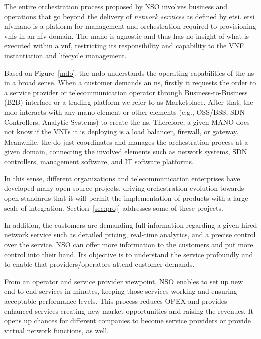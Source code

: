 The entire orchestration process proposed by NSO involves business and operations that go beyond the delivery of \textit{network services} as defined by \gls{etsi}. \gls{etsi} \gls{nfvmano} is a platform for management and orchestration required to provisioning \glspl{vnf} in an \gls{nfv} domain. The \gls{mano} is agnostic and thus has no insight of what is executed within a \gls{vnf}, restricting its responsibility and capability to the VNF instantiation and lifecycle management.

Based on Figure~\ref{mdo}, the \gls{mdo} understands the operating capabilities of the \gls{ns} in a broad sense. When a customer demands an \gls{ns}, firstly it requests the order to a service provider or telecommunication operator through Business-to-Business (B2B) interface or a trading platform we refer to as Marketplace. After that, the \gls{mdo} interacts with any \gls{mano} element or other elements (e.g., OSS/BSS, SDN Controllers, Analytic Systems)  to create the \gls{ns}. Therefore, a given MANO does not know if the VNFs it is deploying is a load balancer, firewall, or gateway. Meanwhile, the \gls{do} just coordinates and manages the orchestration process at a given domain, connecting the involved elements such as network systems, SDN controllers, management software, and IT software platforms.

In this sense, different organizations and telecommunication enterprises have developed many open source projects, driving orchestration evolution towards open standards that it will permit the implementation of products with a large scale of integration. Section~\ref{sec:proj} addresses some of these projects.

In addition, the customers are demanding full information regarding a given hired network service such as detailed pricing, real-time analytics, and a precise control over the service. NSO can offer more information to the customers and put more control into their hand. Its objective is to understand the service profoundly and to enable that providers/operators attend customer demands. 

From an operator and service provider viewpoint, NSO enables to set up new end-to-end services in minutes, keeping those services working and ensuring acceptable performance levels. This process reduces OPEX and provides enhanced services creating new market opportunities and raising the revenues.  It opens up chances for different companies to become service providers or provide virtual network functions, as well.

